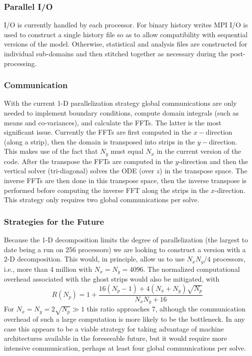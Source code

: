 \documentclass[11pt,a4paper]{article}
\begin{document}
\subsubsection{Parallel I/O}
I/O is currently handled by each processor.  For binary history
writes MPI I/O is used to construct a single history file so as to
allow compatibility with sequential versions of the model. Otherwise,
statistical and analysis files are constructed for individual
sub-domains and then stitched together as necessary during the
post-processing.

\subsubsection{Communication} 
With the current 1-D parallelization strategy global communications
are only needed to implement boundary conditions, compute domain
integrals (such as means and co-variances), and calculate the FFTs.
The latter is the most significant issue.  Currently the FFTs are
first computed in the $x-$direction (along a strip), then the domain
is transposed into strips in the $y-$direction.  This makes use of the
fact that $N_y$ must equal $N_x$ in the current version of the code.
After the transpose the FFTs are computed in the $y$-direction and
then the vertical solver (tri-diagonal) solves the ODE (over $z$) in
the transpose space.  The inverse FFTs are then done in this transpose
space, then the inverse transpose is performed before computing the
inverse FFT along the strips in the $x$-direction.  This strategy only
requires two global communications per solve.

\subsubsection{Strategies for the Future} 
Because the 1-D decomposition limits the degree of parallelization
(the largest to date being a run on 256 processors) we are looking to
construct a version with a 2-D decomposition.  This would, in
principle, allow us to use $N_xN_y/4$ processors, i.e., more than 4
million with $N_x=N_y=4096.$ The normalized computational overhead
associated with the ghost strips would also be mitigated, with
\[R(N_p) = 1 + \frac{16(N_p-1) + 4(N_x+N_y)\sqrt{N_p}}{N_xN_y + 16} \]
For $N_x = N_y = 2\sqrt{N_p} \gg 1$ this ratio approaches 7, although
the communication overhead of such a large computation is more likely
to be the bottleneck.  In any case this appears to be a viable strategy
for taking advantage of machine architectures available in the
foreseeable future, but it would require more intensive communication,
perhaps at least four global communications per solve.
\end{document}
